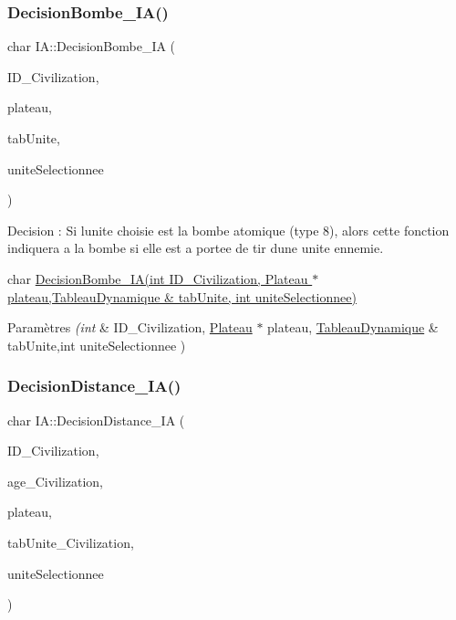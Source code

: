 \subsubsection{\texorpdfstring{Decision\+Bombe\+\_\+\+I\+A()}{DecisionBombe\_IA()}}
{\footnotesize\ttfamily char I\+A\+::\+Decision\+Bombe\+\_\+\+IA (\begin{DoxyParamCaption}\item[{int}]{I\+D\+\_\+\+Civilization,  }\item[{\hyperlink{classPlateau}{Plateau} $\ast$}]{plateau,  }\item[{\hyperlink{classTableauDynamique}{Tableau\+Dynamique} \&}]{tab\+Unite,  }\item[{int}]{unite\+Selectionnee }\end{DoxyParamCaption})}



Decision \+: Si l\textquotesingle{}unite choisie est la bombe atomique (type 8), alors cette fonction indiquera a la bombe si elle est a portee de tir d\textquotesingle{}une unite ennemie. 

char \hyperlink{classIA_ae12dec33731a54b1f48ad39413e23524}{Decision\+Bombe\+\_\+\+I\+A(int I\+D\+\_\+\+Civilization, Plateau $\ast$ plateau,\+Tableau\+Dynamique \& tab\+Unite, int unite\+Selectionnee)} 
\begin{DoxyParams}{Paramètres}
{\em (int} & I\+D\+\_\+\+Civilization, \hyperlink{classPlateau}{Plateau} $\ast$ plateau, \hyperlink{classTableauDynamique}{Tableau\+Dynamique} \& tab\+Unite,int unite\+Selectionnee ) \\
\hline
\end{DoxyParams}
\mbox{\label{classIA_a188b58fc1159684a952e21e45e4622c4}} 
\subsubsection{\texorpdfstring{Decision\+Distance\+\_\+\+I\+A()}{DecisionDistance\_IA()}}
{\footnotesize\ttfamily char I\+A\+::\+Decision\+Distance\+\_\+\+IA (\begin{DoxyParamCaption}\item[{int}]{I\+D\+\_\+\+Civilization,  }\item[{int}]{age\+\_\+\+Civilization,  }\item[{\hyperlink{classPlateau}{Plateau} $\ast$}]{plateau,  }\item[{\hyperlink{classTableauDynamique}{Tableau\+Dynamique} \&}]{tab\+Unite\+\_\+\+Civilization,  }\item[{int}]{unite\+Selectionnee }\end{DoxyParamCaption})}



